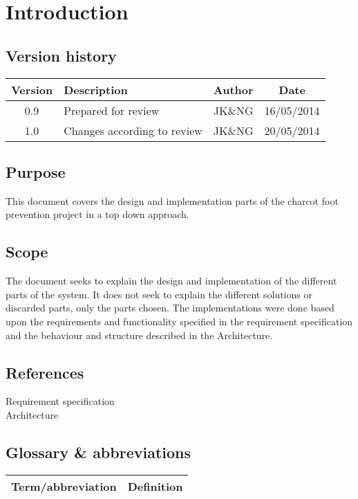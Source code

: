 \chapter{Introduction}
\section{Version history}
\begin{table}[H]
\begin{tabular}{|c|p{9cm}|c|c|}
\hline
Version & Description & Author & Date\\
\hline
0.9	& Prepared for review & JK\&NG & 16/05/2014 \\ \hline
1.0	& Changes according to review & JK\&NG & 20/05/2014 \\ \hline
\end{tabular}
\end{table}

\section{Purpose}
This document covers the design and implementation parts of the charcot foot prevention project in a top down approach.

\section{Scope}
The document seeks to explain the design and implementation of the different parts of the system. It does not seek to explain the different solutions or discarded parts, only the parts chosen. The implementations were done based upon the requirements and functionality specified in the requirement specification and the behaviour and structure described in the Architecture.

\section{References}
Requirement specification \\
Architecture \\

\section{Glossary \& abbreviations}
\begin{table}[H]
\centering
\begin{tabular}{|p{4cm}|p{7cm}|}
\hline
Term/abbreviation & Definition\\ \hline
\end{tabular}
\end{table}
